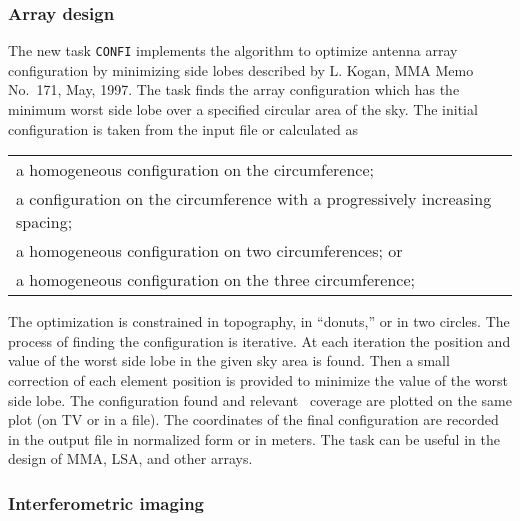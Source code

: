\subsubsection{Array design}

The new task {\tt CONFI} implements the algorithm to optimize antenna
array configuration by minimizing side lobes described by L. Kogan,
MMA Memo No.~171, May, 1997.  The task finds the array configuration
which has the minimum worst side lobe over a specified circular area
of the sky.  The initial configuration is taken from the input file or
calculated as\par
\vspace{-8pt}
\begin{center}
\begin{tabular}{l}
  a homogeneous configuration on the circumference; \\
  a configuration on the circumference with a progressively increasing
     spacing;  \\
  a homogeneous configuration on two circumferences; or \\
  a homogeneous configuration on the three circumference;
\end{tabular}
\end{center}
\vspace{-8pt}
The optimization is constrained in topography, in ``donuts,'' or in
two circles.  The process of finding the configuration is iterative.
At each iteration the position and value of the worst side lobe in the
given sky area is found.  Then a small correction of each element
position is provided to minimize the value of the worst side lobe.
The configuration found and relevant \uv\ coverage are plotted on the
same plot (on TV or in a file).  The coordinates of the final
configuration are recorded in the output file in normalized form or in
meters.  The task can be useful in the design of MMA, LSA, and other
arrays.

\subsubsection{Interferometric imaging}

